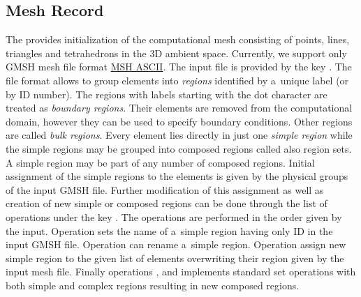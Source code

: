 \subsection{Mesh Record}
\label{sec:Mesh}
The  provides initialization of the computational mesh consisting of points, lines, triangles and tetrahedrons in the 3D ambient space.
Currently, we support only GMSH mesh file format \href{http://geuz.org/gmsh/doc/texinfo/gmsh.html#MSH-ASCII-file-format}{MSH ASCII}. 
The input file is provided by the key . The file format allows to group elements into {\it regions} 
identified by a~unique label (or by ID number). The regions with labels starting with the dot character are treated as {\it boundary regions}. 
Their elements are removed from the computational domain, however they can be used to specify boundary
conditions. Other regions are called {\it bulk regions}. Every element lies directly in just one {\it simple region} while the simple regions may be 
grouped into composed regions called also region sets. A simple region may be part of any number of composed regions.
Initial assignment of the simple regions to the elements is given by the physical groups of the input GMSH file. Further
modification of this assignment as well as creation of new simple or composed regions can be done 
through the list of operations under the key . The operations are performed in the order given by the input.
Operation  sets the name of a~simple region having only ID in the input GMSH file. Operation 
 can rename a~simple region. Operation 
assign new simple region to the given list of elements overwriting their region given by the input mesh file. Finally operations 
,  and 
implements standard set operations with both simple and complex regions resulting in new composed regions.




